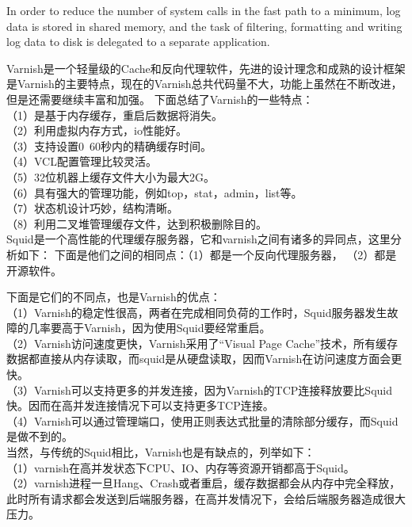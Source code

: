 In order to reduce the number of system calls in the fast path to a minimum, log data is stored in shared memory, and the task of filtering, formatting and writing log data to disk is delegated to a separate application.


Varnish是一个轻量级的Cache和反向代理软件，先进的设计理念和成熟的设计框架是Varnish的主要特点，现在的Varnish总共代码量不大，功能上虽然在不断改进，但是还需要继续丰富和加强。
下面总结了Varnish的一些特点：\\
 （1）是基于内存缓存，重启后数据将消失。\\
 （2）利用虚拟内存方式，io性能好。\\
 （3）支持设置0~60秒内的精确缓存时间。\\
 （4）VCL配置管理比较灵活。\\
 （5）32位机器上缓存文件大小为最大2G。\\
 （6）具有强大的管理功能，例如top，stat，admin，list等。\\
 （7）状态机设计巧妙，结构清晰。\\
 （8）利用二叉堆管理缓存文件，达到积极删除目的。\\
 

Squid是一个高性能的代理缓存服务器，它和varnish之间有诸多的异同点，这里分析如下：
 下面是他们之间的相同点：（1）都是一个反向代理服务器， （2）都是开源软件。
 
 下面是它们的不同点，也是Varnish的优点：\\
 （1）Varnish的稳定性很高，两者在完成相同负荷的工作时，Squid服务器发生故障的几率要高于Varnish，因为使用Squid要经常重启。\\
 （2）Varnish访问速度更快，Varnish采用了“Visual Page Cache”技术，所有缓存数据都直接从内存读取，而squid是从硬盘读取，因而Varnish在访问速度方面会更快。\\
 （3）Varnish可以支持更多的并发连接，因为Varnish的TCP连接释放要比Squid快。因而在高并发连接情况下可以支持更多TCP连接。\\
 （4）Varnish可以通过管理端口，使用正则表达式批量的清除部分缓存，而Squid是做不到的。\\
 当然，与传统的Squid相比，Varnish也是有缺点的，列举如下：\\
 （1）varnish在高并发状态下CPU、IO、内存等资源开销都高于Squid。\\
 （2）varnish进程一旦Hang、Crash或者重启，缓存数据都会从内存中完全释放，此时所有请求都会发送到后端服务器，在高并发情况下，会给后端服务器造成很大压力。\\


